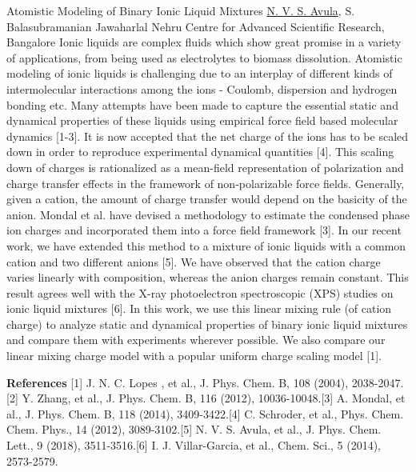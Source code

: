 
    \begin{abstract_online}{Atomistic Modeling of Binary Ionic Liquid Mixtures}{%
        \underline{N. V. S. Avula}, S. Balasubramanian}{%
        }{%
        Jawaharlal Nehru Centre for Advanced Scientific Research, Bangalore}
    Ionic liquids are complex fluids which show great promise in a variety of applications, from being used as electrolytes to biomass dissolution. Atomistic modeling of ionic liquids is challenging due to an interplay of different kinds of intermolecular interactions among the ions - Coulomb, dispersion and hydrogen bonding etc. Many attempts have been made to capture the essential static and dynamical properties of these liquids using empirical force field based molecular dynamics [1-3]. It is now accepted that the net charge of the ions has to be scaled down in order to reproduce experimental dynamical quantities [4]. This scaling down of charges is rationalized as a mean-field representation of polarization and charge transfer effects in the framework of non-polarizable force fields. Generally, given a cation, the amount of charge transfer would depend on the basicity of the anion. Mondal et al. have devised a methodology to estimate the condensed phase ion charges and incorporated them into a force field framework [3]. In our recent work, we have extended this method to a mixture of ionic liquids with a common cation and two different anions [5]. We have observed that the cation charge varies linearly with composition, whereas the anion charges remain constant. This result agrees well with the X-ray photoelectron spectroscopic (XPS) studies on ionic liquid mixtures [6]. In this work, we use this linear mixing rule (of cation charge) to analyze static and dynamical properties of binary ionic liquid mixtures and compare them with experiments wherever possible. We also compare our linear mixing charge model with a popular uniform charge scaling model [1]. 
    
        \textbf{References} \newline{}[1] J. N. C. Lopes , et al., J. Phys. Chem. B, 108 (2004), 2038-2047.\newline{}[2] Y. Zhang, et al., J. Phys. Chem. B, 116 (2012), 10036-10048.\newline{}[3] A. Mondal, et al., J. Phys. Chem. B, 118 (2014), 3409-3422.\newline{}[4] C. Schroder, et al., Phys. Chem. Chem. Phys., 14 (2012), 3089-3102.\newline{}[5] N. V. S. Avula, et al., J. Phys. Chem. Lett., 9 (2018), 3511-3516.\newline{}[6] I. J. Villar-Garcia, et al., Chem. Sci., 5 (2014), 2573-2579. 
    \end{abstract_online}
    
